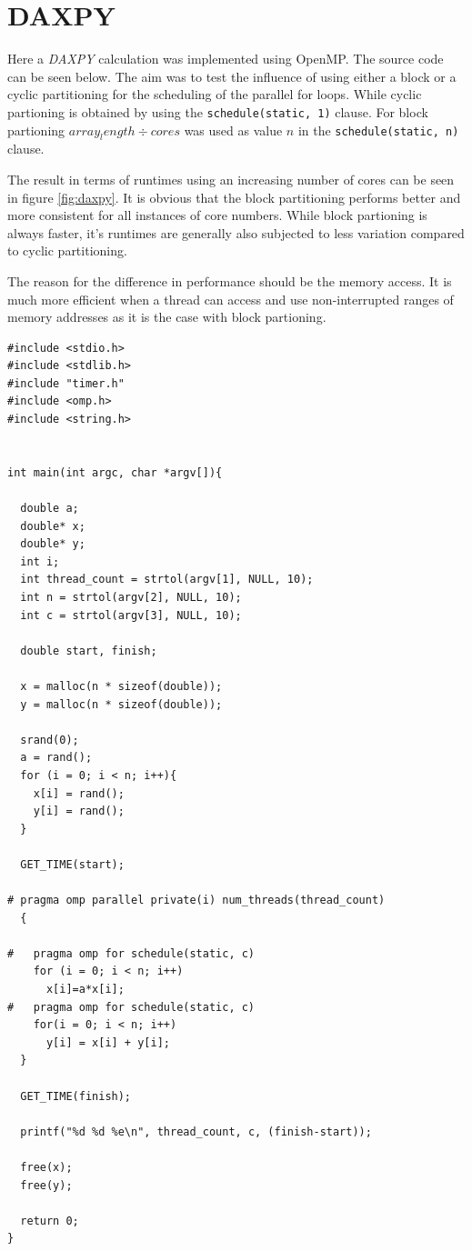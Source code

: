 \documentclass[a4paper,11pt,twoside]{article}
\begin{document}
\section{DAXPY}
Here a \textit{DAXPY} calculation was implemented using OpenMP. The source code can be seen below. The aim was to test the influence of using either a block or a cyclic partitioning for the scheduling of the parallel for loops. While cyclic partioning is obtained by using the \verb+schedule(static, 1)+ clause. For block partioning $array_length \div cores$ was used as value $n$ in the \verb+schedule(static, n)+ clause.

 The result in terms of runtimes using an increasing number of cores can be seen in figure \ref{fig:daxpy}. It is obvious that the block partitioning performs better and more consistent for all instances of core numbers. While block partioning is always faster, it's runtimes are generally also subjected to less variation compared to cyclic partitioning.

The reason for the difference in performance should be the memory access. It is much more efficient when a thread can access and use non-interrupted ranges of memory addresses as it is the case with block partioning.  
 
\begin{verbatim}
#include <stdio.h>
#include <stdlib.h>
#include "timer.h"
#include <omp.h>
#include <string.h>


int main(int argc, char *argv[]){

  double a;
  double* x;
  double* y;
  int i;
  int thread_count = strtol(argv[1], NULL, 10);
  int n = strtol(argv[2], NULL, 10);
  int c = strtol(argv[3], NULL, 10);
  
  double start, finish;

  x = malloc(n * sizeof(double));
  y = malloc(n * sizeof(double));
  
  srand(0);
  a = rand();
  for (i = 0; i < n; i++){
    x[i] = rand();
    y[i] = rand();
  }
  
  GET_TIME(start);

# pragma omp parallel private(i) num_threads(thread_count)
  {

#   pragma omp for schedule(static, c)
    for (i = 0; i < n; i++)
      x[i]=a*x[i];
#   pragma omp for schedule(static, c)
    for(i = 0; i < n; i++)
      y[i] = x[i] + y[i];
  }

  GET_TIME(finish);

  printf("%d %d %e\n", thread_count, c, (finish-start));

  free(x);
  free(y);

  return 0;
}

\end{verbatim}
\end{document}
